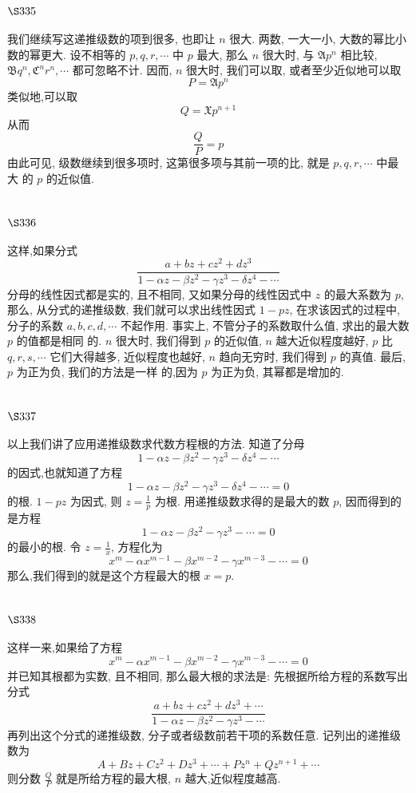 \section{$\S 335$}

我们继续写这递推级数的项到很多, 也即让 $n$ 很大. 两数, 一大一小, 大数的幂比小 数的幂更大. 设不相等的 $p, q, r, \cdots$ 中 $p$ 最大, 那么 $n$ 很大时, 与 $\mathfrak{A} p^{n}$ 相比较, $\mathfrak{B} q^{n}, \mathfrak{C}^{n} r^{n}, \cdots$ 都可忽略不计. 因而, $n$ 很大时, 我们可以取, 或者至少近似地可以取
\[
P=\mathfrak{A} p^{n}
\]
类似地,可以取
\[
Q=\mathfrak{X} p^{n+1}
\]
从而
\[
\frac{Q}{P}=p
\]
由此可见, 级数继续到很多项时, 这第很多项与其前一项的比, 就是 $p, q, r, \cdots$ 中最大 的 $p$ 的近似值.

\section{$\S 336$}

这样,如果分式
\[
\frac{a+b z+c z^{2}+d z^{3}}{1-\alpha z-\beta z^{2}-\gamma z^{3}-\delta z^{4}-\cdots}
\]
分母的线性因式都是实的, 且不相同, 又如果分母的线性因式中 $z$ 的最大系数为 $p$, 那么, 从分式的递推级数, 我们就可以求出线性因式 $1-p z$, 在求该因式的过程中, 分子的系数 $a, b, c, d, \cdots$ 不起作用. 事实上, 不管分子的系数取什么值, 求出的最大数 $p$ 的值都是相同 的. $n$ 很大时, 我们得到 $p$ 的近似值, $n$ 越大近似程度越好, $p$ 比 $q, r, s, \cdots$ 它们大得越多, 近似程度也越好, $n$ 趋向无穷时, 我们得到 $p$ 的真值. 最后, $p$ 为正为负, 我们的方法是一样 的,因为 $p$ 为正为负, 其幂都是增加的.

\section{$\S 337$}

以上我们讲了应用递推级数求代数方程根的方法. 知道了分母
\[
1-\alpha z-\beta z^{2}-\gamma z^{3}-\delta z^{4}-\cdots
\]
的因式,也就知道了方程
\[
1-\alpha z-\beta z^{2}-\gamma z^{3}-\delta z^{4}-\cdots=0
\]
的根. $1-p z$ 为因式, 则 $z=\frac{1}{p}$ 为根. 用递推级数求得的是最大的数 $p$, 因而得到的是方程
\[
1-\alpha z-\beta z^{2}-\gamma z^{3}-\cdots=0
\]
的最小的根. 令 $z=\frac{1}{x}$, 方程化为
\[
x^{m}-\alpha x^{m-1}-\beta x^{m-2}-\gamma x^{m-3}-\cdots=0
\]
那么,我们得到的就是这个方程最大的根 $x=p$.

\section{$\S 338$}

这样一来,如果给了方程
\[
x^{m}-\alpha x^{m-1}-\beta x^{m-2}-\gamma x^{m-3}-\cdots=0
\]
并已知其根都为实数, 且不相同, 那么最大根的求法是: 先根据所给方程的系数写出分式
\[
\frac{a+b z+c z^{2}+d z^{3}+\cdots}{1-\alpha z-\beta z^{2}-\gamma z^{3}-\cdots}
\]
再列出这个分式的递推级数, 分子或者级数前若干项的系数任意. 记列出的递推级数为
\[
A+B z+C z^{2}+D z^{3}+\cdots+P z^{n}+Q z^{n+1}+\cdots
\]
则分数 $\frac{Q}{P}$ 就是所给方程的最大根, $n$ 越大,近似程度越高.

